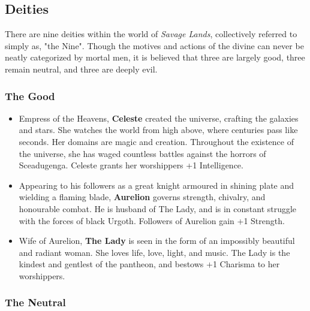 \documentclass{article}
\begin{document}
\subsection{Deities}

There are nine deities within the world of {\it Savage Lands}, collectively
referred to simply as, "the Nine".  Though the motives and actions of the
divine can never be neatly categorized by mortal men, it is believed that
three are largely good, three remain neutral, and three are deeply evil.

\subsubsection{The Good}

\begin{itemize}
\item Empress of the Heavens, {\bf Celeste} created the universe, crafting 
the galaxies and stars.  She watches the world from high above, where 
centuries pass like seconds.  Her domains are magic and creation.  
Throughout the existence of the universe, she has waged countless battles 
against the horrors of Sceadugenga.  Celeste grants her worshippers +1 
Intelligence.

\item Appearing to his followers as a great knight armoured in shining
plate and wielding a flaming blade, {\bf Aurelion} governs strength, 
chivalry, and honourable combat.  He is husband of The Lady, and is in 
constant struggle with the forces of black Urgoth.  Followers of Aurelion 
gain +1 Strength.

\item Wife of Aurelion, {\bf The Lady} is seen in the form of an 
impossibly beautiful and radiant woman.  She loves life, love, light, and 
music.  The Lady is the kindest and gentlest of the pantheon, and bestows 
+1 Charisma to her worshippers.
\end{itemize}

\subsubsection{The Neutral}
\end{document}

